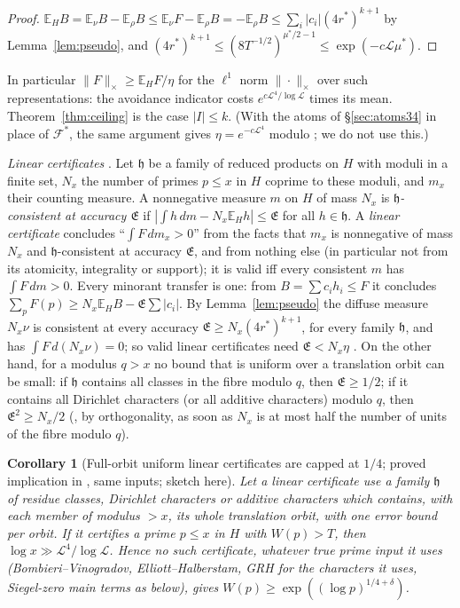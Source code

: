 \documentclass[11pt,reqno]{amsart}
\newtheorem{corollary}[theorem]{Corollary}
\theoremstyle{definition}
\newcommand{\Lc}{\mathcal L}
\newcommand{\E}{\mathbb E}
\begin{document}
\begin{proof}
$\E_HB=\E_\nu B-\E_\rho B\le\E_\nu F-\E_\rho B=-\E_\rho B\le\sum_i|c_i|(4r^*)^{k+1}$ by
Lemma~\ref{lem:pseudo}, and $(4r^*)^{k+1}\le(8T^{-1/2})^{\mu^*/2-1}\le\exp(-c\Lc\mu^*)$.
\end{proof}

In particular $\|F\|_\times\ge\E_HF/\eta$ for the $\ell^1$ norm $\|\cdot\|_\times$ over such
representations: the avoidance indicator costs $e^{c\Lc^4/\log\Lc}$ times its
mean.  Theorem~\ref{thm:ceiling} is the case $|I|\le k$.  (With the atoms of
\S\ref{sec:atoms34} in place of $\mathcal F^*$, the same argument gives
$\eta=e^{-c\Lc^4}$ modulo \cite{TQ}; we do not use this.)

\emph{Linear certificates} \cite[Def.~2.1]{O15}.  Let $\mathfrak h$ be a family of
reduced products on $H$ with moduli in a finite set, $N_x$ the number of
primes $p\le x$ in $H$ coprime to these moduli, and $m_x$ their counting
measure.  A nonnegative measure $m$ on $H$ of mass $N_x$ is
\emph{$\mathfrak h$-consistent at accuracy $\mathfrak E$} if $|\int h\,dm-N_x\E_Hh|\le\mathfrak E$ for all $h\in\mathfrak h$.  A
\emph{linear certificate} concludes ``$\int F\,dm_x>0$'' from the facts that $m_x$ is
nonnegative of mass $N_x$ and $\mathfrak h$-consistent at accuracy $\mathfrak E$, and from
nothing else (in particular not from its atomicity, integrality or
support); it is valid iff every consistent $m$ has $\int F\,dm>0$.  Every
minorant transfer is one: from $B=\sum c_ih_i\le F$ it concludes
$\sum_pF(p)\ge N_x\E_HB-\mathfrak E\sum|c_i|$.  By Lemma~\ref{lem:pseudo} the diffuse measure
$N_x\nu$ is consistent at every accuracy $\mathfrak E\ge N_x(4r^*)^{k+1}$, for every family
$\mathfrak h$, and has $\int F\,d(N_x\nu)=0$; so valid linear certificates need
$\mathfrak E<N_x\eta$ \cite[Thm.~2.2]{O15}.  On the other hand, for a modulus $q>x$ no
bound that is uniform over a translation orbit can be small: if $\mathfrak h$
contains all classes in the fibre modulo $q$, then $\mathfrak E\ge1/2$; if it contains all
Dirichlet characters (or all additive characters) modulo $q$, then
$\mathfrak E^2\ge N_x/2$ (\cite[Lemma~2.3]{O15}, by orthogonality, as soon as $N_x$ is at most half
the number of units of the fibre modulo $q$).

\begin{corollary}[Full-orbit uniform linear certificates are capped at $1/4$; proved implication in {\cite[Cor.~2.4]{O15}}, same inputs; sketch here]\label{cor:orbit}
Let a linear certificate use a family $\mathfrak h$ of residue classes, Dirichlet
characters or additive characters which contains, with each member of
modulus $>x$, its whole translation orbit, with one error bound per orbit.
If it certifies a prime $p\le x$ in $H$ with $W(p)>T$, then
$\log x\gg\Lc^4/\log\Lc$.  Hence no such certificate, whatever true prime input
it uses (Bombieri--Vinogradov, Elliott--Halberstam, GRH for the characters
it uses, Siegel-zero main terms as below), gives $W(p)\ge\exp((\log p)^{1/4+\delta})$.
\end{corollary}
\end{document}

